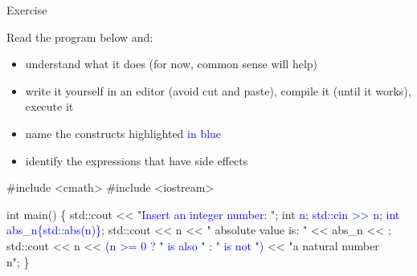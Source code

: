 \begin{frame}[fragile]{Exercise }

  Read the program below and:
  \begin{itemize}
  \item understand what it does (for now, common sense will help)
  \item write it yourself in an editor (avoid cut and paste), compile it (until
        it works), execute it
  \item name the constructs highlighted \textcolor{blue}{in blue}
  \item identify the expressions that have side effects
  \end{itemize}

  \begin{codeblock}{
#include <cmath>
#include <iostream>

int main() \{
  std::cout << \textcolor{blue}{"Insert an integer number: "};
  int \textcolor{blue}{n};
  \textcolor{blue}{std::cin >> n};
  \textcolor{blue}{int abs_n\{std::abs(n)\}};
  std::cout << n << " absolute value is: " << abs_n << \bslashn{};
  std::cout << n << \textcolor{blue}{(n >= 0 ? " is also " : " is not ")}
            << "a natural number\\n";
\}}\end{codeblock}

\end{frame}
